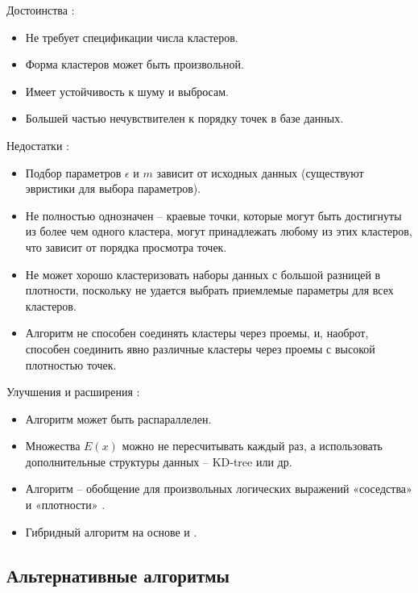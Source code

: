 \noindent Достоинства :

\begin{itemize}
	\item Не требует спецификации числа кластеров.
	\item Форма кластеров может быть произвольной.
	\item Имеет устойчивость к шуму и выбросам.
	\item Большей частью нечувствителен к порядку точек в базе данных.
\end{itemize}

\noindent Недостатки :

\begin{itemize}
	\item Подбор параметров $\epsilon$ и $m$ зависит от исходных данных (существуют эвристики для выбора параметров).
	\item Не полностью однозначен -- краевые точки, которые могут быть достигнуты из более чем одного кластера, могут принадлежать любому из этих кластеров, что зависит от порядка просмотра точек.
	\item Не может хорошо кластеризовать наборы данных с большой разницей в плотности, поскольку не удается выбрать приемлемые параметры для всех кластеров.
	\item Алгоритм не способен соединять кластеры через проемы, и, наоброт, способен соединить явно различные кластеры через проемы с высокой плотностью точек.
\end{itemize}

\noindent Улучшения и расширения :

\begin{itemize}
	\item Алгоритм может быть распараллелен.
	\item Множества $E(x)$ можно не пересчитывать каждый раз, а использовать дополнительные структуры данных -- KD-tree или др.
	\item Алгоритм  -- обобщение  для произвольных логических выражений «соседства» и «плотности» \cite{gdbscan}.
	\item Гибридный алгоритм  на основе  и  \cite{fastdbscan}.
\end{itemize}

\subsection{Альтернативные алгоритмы}


